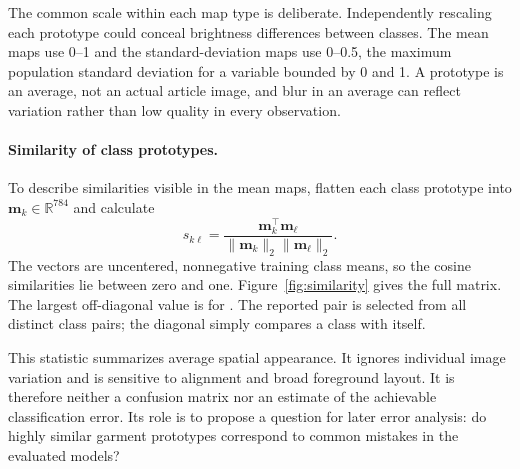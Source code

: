 The common scale within each map type is deliberate. Independently rescaling
each prototype could conceal brightness differences between classes. The mean
maps use 0--1 and the standard-deviation maps use 0--0.5, the maximum population
standard deviation for a variable bounded by 0 and 1. A prototype is an average,
not an actual article image, and blur in an average can reflect variation rather
than low quality in every observation.
\FloatBarrier

\paragraph{Similarity of class prototypes.}
To describe similarities visible in the mean maps, flatten each class prototype
into \(\boldsymbol{m}_k\in\mathbb{R}^{784}\) and calculate
\begin{equation}
 s_{k\ell}=\frac{\boldsymbol{m}_k^\top\boldsymbol{m}_{\ell}}
 {\lVert\boldsymbol{m}_k\rVert_2\lVert\boldsymbol{m}_{\ell}\rVert_2}.
 \label{eq:cosine}
\end{equation}
The vectors are uncentered, nonnegative training class means, so the cosine
similarities lie between zero and one. Figure~\ref{fig:similarity} gives the full
matrix. The largest off-diagonal value is \MostSimilarCosine{} for
\MostSimilarClasses{}. The reported pair is selected from all distinct
class pairs; the diagonal simply compares a class with itself.

This statistic summarizes average spatial appearance. It ignores individual
image variation and is sensitive to alignment and broad foreground layout.
It is therefore neither a confusion matrix nor an estimate of the achievable
classification error. Its role is to propose a question for later error
analysis: do highly similar garment prototypes correspond to common mistakes
in the evaluated models?
\FloatBarrier



